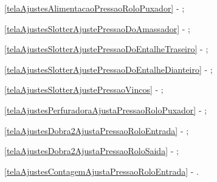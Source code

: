 \begin{procedureAdjustmentNoRecipe}
    \begin{pressureAdjustment}
      \item[\ding{\dingNumber}] \ref{telaAjustesAlimentacaoPressaoRoloPuxador} - ;
      \item[\ding{\dingNumber}] \ref{telaAjustesSlotterAjustePressaoDoAmassador} - ;
      \item[\ding{\dingNumber}] \ref{telaAjustesSlotterAjustePressaoDoEntalheTraseiro} - ;
      \item[\ding{\dingNumber}] \ref{telaAjustesSlotterAjustePressaoDoEntalheDianteiro} - ;
      \item[\ding{\dingNumber}] \ref{telaAjustesSlotterAjustePressaoVincos} - ;
      \item[\ding{\dingNumber}] \ref{telaAjustesPerfuradoraAjustaPressaoRoloPuxador} - ;
      \item[\ding{\dingNumber}] \ref{telaAjustesDobra2AjustaPressaoRoloEntrada} - ;
      \item[\ding{\dingNumber}] \ref{telaAjustesDobra2AjustaPressaoRoloSaida} - ;
      \item[\ding{\dingNumber}] \ref{telaAjustesContagemAjustaPressaoRoloEntrada} - .
    \end{pressureAdjustment}

    \newpage
    \thispagestyle{fancy}
    \vspace*{50 pt}


\end{procedureAdjustmentNoRecipe}
